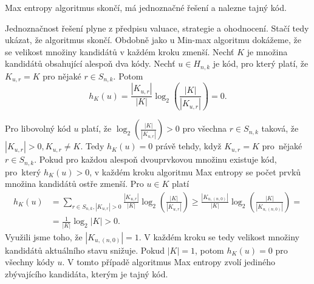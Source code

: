 \begin{tvrz}
    Max entropy algoritmus skončí, má jednoznačné řešení a nalezne tajný kód.
\end{tvrz}
\begin{dukaz}
    Jednoznačnost řešení plyne z předpisu valuace, strategie a ohodnocení. Stačí tedy ukázat, že algoritmus skončí. Obdobně jako u Min-max algoritmu dokážeme, že se velikost množiny kandidátů v každém kroku zmenší. Nechť $K$ je množina kandidátů obsahující alespoň dva kódy. 
    Nechť $u\in H_{n,k}$ je kód, pro který platí, že $K_{u,r} = K$ pro nějaké $r\in S_{n,k}$. Potom 
    \[h_K(u) = \frac{|K_{u,r}|}{|K|}\log_2\left( \frac{|K|}{|K_{u,r}|} \right) = 0.\]
    
    Pro libovolný kód $u$ platí, že $\log_2\left( \frac{|K|}{|K_{u,r}|} \right)  > 0 $ pro všechna $r\in S_{n,k}$ taková, že $|K_{u,r}| > 0, K_{u,r} \neq K$. Tedy $h_K(u) = 0$ právě tehdy, když $K_{u,r} = K$ pro~nějaké $r\in S_{n,k}$. Pokud pro každou alespoň dvouprvkovou množinu existuje kód, pro~který $h_K(u) > 0$, v každém kroku algoritmu Max entropy se počet prvků množina kandidátů ostře zmenší. Pro $u \in K$ platí
    \begin{align*}
        h_K(u) &= \sum_{r\in S_{n,k}, |K_{u,r}| > 0} \frac{|K_{u,r}|}{|K|}\log_2\left( \frac{|K|}{|K_{u,r}|} \right) 
    \geq 
    \frac{|K_{u,(n,0)}|}{|K|}\log_2\left( \frac{|K|}{|K_{u,(n,0)}|} \right)
    = \\
    &=\frac{1}{|K|} \log_2 |K| > 0.
    \end{align*}
    Využili jsme toho, že $|K_{u,(n,0)}| = 1$. V každém kroku se tedy velikost množiny kandidátů aktuálního stavu snižuje. Pokud $|K| = 1$, potom $h_K(u) = 0$ pro všechny kódy $u$. V tomto případě algoritmus Max entropy zvolí jediného zbývajícího kandidáta, kterým je tajný kód. 
    
\end{dukaz}

